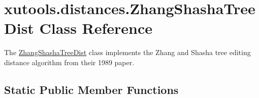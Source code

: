 \hypertarget{classxutools_1_1distances_1_1_zhang_shasha_tree_dist}{\section{xutools.\-distances.\-Zhang\-Shasha\-Tree\-Dist Class Reference}
\label{classxutools_1_1distances_1_1_zhang_shasha_tree_dist}
}


The \hyperlink{classxutools_1_1distances_1_1_zhang_shasha_tree_dist}{Zhang\-Shasha\-Tree\-Dist} class implements the Zhang and Shasha tree editing distance algorithm from their 1989 paper.  


\subsection*{Static Public Member Functions}
